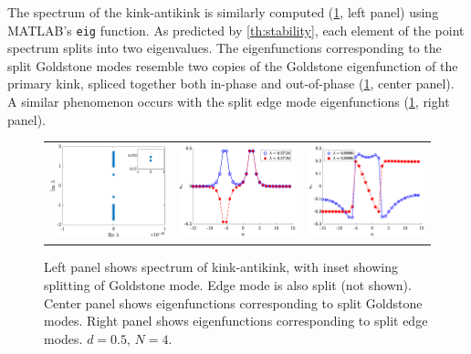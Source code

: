 \documentclass[12pt,reqno]{amsart}
\begin{document}
The spectrum of the kink-antikink is similarly computed (\cref{fig:kakspec}, left panel) using MATLAB's \texttt{eig} function. As predicted by \cref{th:stability}, each element of the point spectrum splits into two eigenvalues. The eigenfunctions corresponding to the split Goldstone modes resemble two copies of the Goldstone eigenfunction of the primary kink, spliced together both in-phase and out-of-phase (\cref{fig:kakspec}, center panel). A similar phenomenon occurs with the split edge mode eigenfunctions (\cref{fig:kakspec}, right panel).

\begin{figure}[H]
	\begin{center}
	\begin{tabular}{ccc}
	\includegraphics[width=5cm]{kak50_8spec.eps}	&
	\includegraphics[width=5cm]{kak50_8goldstone.eps} &
	\includegraphics[width=5cm]{kak50_8edge.eps}
	\end{tabular}
	\end{center}
	\caption{Left panel shows spectrum of kink-antikink, with inset showing splitting of Goldstone mode. Edge mode is also split (not shown). Center panel shows eigenfunctions corresponding to split Goldstone modes. Right panel shows eigenfunctions corresponding to split edge modes. $d = 0.5$, $N = 4$.}
	\label{fig:kakspec}
\end{figure}
\end{document}
